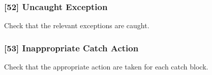 \subsubsection{[52] Uncaught Exception}
Check that the relevant exceptions are caught.
\subsubsection{[53] Inappropriate Catch Action}
Check that the appropriate action are taken for each catch block.